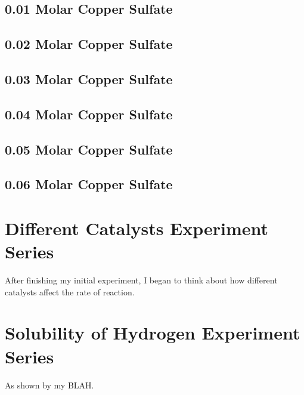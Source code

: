 	\subsection{0.01 Molar Copper Sulfate}

	\subsection{0.02 Molar Copper Sulfate}

	\subsection{0.03 Molar Copper Sulfate}

	\subsection{0.04 Molar Copper Sulfate}

	\subsection{0.05 Molar Copper Sulfate}

	\subsection{0.06 Molar Copper Sulfate}



\section{Different Catalysts Experiment Series}

After finishing my initial experiment, I began to think about how different catalysts affect the rate of reaction. 


\section{Solubility of Hydrogen Experiment Series}

As shown by my BLAH. 